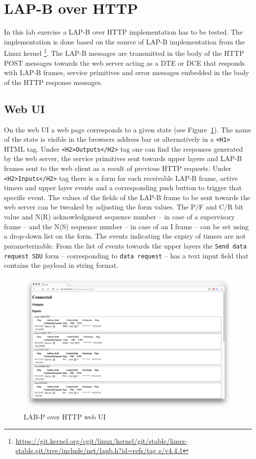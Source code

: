 \documentclass[a4paper]{article}
\begin{document}
\section{LAP-B over HTTP}

In this lab exercise a LAP-B over HTTP implementation has to be tested. The implementation is done based on the source
of LAP-B implementation from the Linux kernel
\footnote{\url{https://git.kernel.org/cgit/linux/kernel/git/stable/linux-stable.git/tree/include/net/lapb.h?id=refs/tag
        s/v4.4.1}}. The LAP-B messages are transmitted in the body of the HTTP POST messages towards the web server
acting as a
DTE or DCE that responds with LAP-B frames, service primitives and error messages embedded in the body of the HTTP
response messages.

\subsection{Web UI}

On the web UI a web page corresponds to a given state (see Figure~\ref{fig:web}). The name of the state is visible in
the browsers address bar or alternatively in  a \verb!<H1>! HTML tag.
Under \verb!<H2>Outputs</H2>! tag one can find the responses generated by the web server, the service primitives
sent towards upper layers and LAP-B frames sent to the web client as a result of previous HTTP requests.
Under \verb!<H2>Inputs</H2>! tag there is a form for each receivable LAP-B frame, active timers and upper layer
events and a corresponding push button to trigger that specific event. The values of the fields of the LAP-B frame to
be sent towards the web server can be tweaked by adjusting the form values. The P/F and C/R bit value and N(R)
acknowledgment sequence number -- in case of a supervisory frame -- and the N(S) sequence number -- in case of an I
frame --  can be set using a drop-down list on the form. The events indicating the expiry of timers are not
parameterizable. From the list of events towards the upper layers the \verb!Send data request SDU! form -- corresponding
to \verb!data request! -- has a text input field that contains the payload in string format.

\begin{figure}[!htb]
    \centering
    \includegraphics[width=\textwidth]{figures/web.png}
    \caption{LAB-P over HTTP web UI}
    \label{fig:web}
\end{figure}
\end{document}
